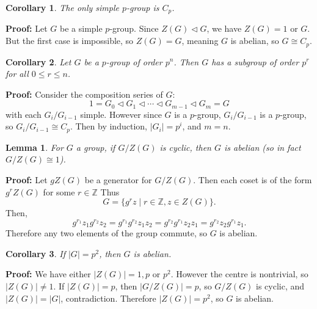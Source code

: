 \documentclass[12pt]{article}
\newtheorem{corollary}{Corollary}[section]
\newtheorem{lemma}{Lemma}[section]
\theoremstyle{definition}
\theoremstyle{remark}
\begin{document}
\begin{corollary}
	The only simple $p$-group is $C_p$.
\end{corollary}

\begin{adjustbox}{minipage = \columnwidth - 25.5pt, margin=1em, frame=1pt, margin=0em}
\textbf{Proof:} Let $G$ be a simple $p$-group. Since $Z(G) \lhd G$, we have $Z(G) = 1$ or $G$. But the first case is impossible, so $Z(G) = G$, meaning $G$ is abelian, so $G \cong C_p$.

\end{adjustbox}

\begin{corollary}
	Let $G$ be a $p$-group of order $p^{n}$. Then $G$ has a subgroup of order $p^{r}$ for all $0 \leq r \leq n$.
\end{corollary}

\begin{adjustbox}{minipage = \columnwidth - 25.5pt, margin=1em, frame=1pt, margin=0em}
\textbf{Proof:} Consider the composition series of $G$:
\[
1 = G_0 \lhd G_1 \lhd \cdots \lhd G_{m-1} \lhd G_m = G
\]
with each $G_i/G_{i-1}$ simple. However since $G$ is a $p$-group, $G_i/G_{i-1}$ is a $p$-group, so $G_i/G_{i-1} \cong C_p$. Then by induction, $|G_i| = p^{i}$, and $m = n$.

\end{adjustbox}


\begin{lemma}
	For $G$ a group, if $G/Z(G)$ is cyclic, then $G$ is abelian (so in fact $G/Z(G) \cong 1$).
\end{lemma}

\begin{adjustbox}{minipage = \columnwidth - 25.5pt, margin=1em, frame=1pt, margin=0em}
\textbf{Proof:} Let $gZ(G)$ be a generator for $G/Z(G)$. Then each coset is of the form $g^{r}Z(G)$ for some $r \in \mathbb{Z}$ Thus
\[
	G = \{g^{r}z \mid r \in \mathbb{Z}, z \in Z(G)\}
.\]
Then,
\[
g^{r_1}z_1 g^{r_2}z_2 = g^{r_1}g^{r_2}z_1z_2 = g^{r_2}g^{r_1}z_2z_1 = g^{r_2}z_2g^{r_1}z_1
.\]
Therefore any two elements of the group commute, so $G$ is abelian.

\end{adjustbox}

\begin{corollary}
	If $|G| = p^2$, then $G$ is abelian.
\end{corollary}

\begin{adjustbox}{minipage = \columnwidth - 25.5pt, margin=1em, frame=1pt, margin=0em}
\textbf{Proof:} We have either $|Z(G)| = 1, p$ or $p^2$. However the centre is nontrivial, so $|Z(G)| \neq 1$. If $|Z(G)| = p$, then $|G/Z(G)| = p$, so $G/Z(G)$ is cyclic, and $|Z(G)| = |G|$, contradiction. Therefore $|Z(G)| = p^2$, so $G$ is abelian.

\end{adjustbox}
\end{document}
